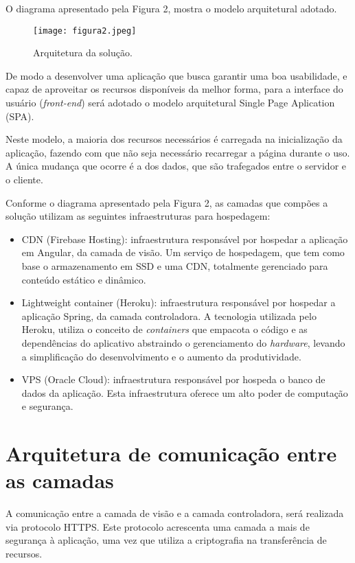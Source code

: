 \documentclass[
    12pt,               %
    openright,          %
    oneside,
    a4paper,            %
    paginasA3,  %
    MODELO,             %
    TODO,               %
    english,            %
    brazil              %
    ]{ifsp-spo-inf-ctds} %
\begin{document}
O diagrama apresentado pela Figura 2, mostra o modelo arquitetural adotado.

\begin{figure}[htb]
    \centering
	\texttt{[image: figura2.jpeg]}
	\caption{\label{fig_logo} Arquitetura da solução.}
\end{figure}
 
De modo a desenvolver uma aplicação que busca garantir uma boa usabilidade, e capaz de aproveitar os recursos disponíveis da melhor forma, para a interface do usuário (\textit{front-end}) será adotado o modelo arquitetural Single Page Aplication (SPA). 

Neste modelo, a maioria dos recursos necessários é carregada na inicialização da aplicação, fazendo com que não seja necessário recarregar a página durante o uso. A única mudança que ocorre é a dos dados, que são trafegados entre o servidor e o cliente.

Conforme o diagrama apresentado pela Figura 2, as camadas que compões a solução utilizam as seguintes infraestruturas para hospedagem:
\begin{itemize}
\item CDN (Firebase Hosting): infraestrutura responsável por hospedar a aplicação em Angular, da camada de visão. Um serviço de hospedagem, que tem como base o armazenamento em SSD e uma CDN, totalmente gerenciado para conteúdo estático e dinâmico.
\item  Lightweight container (Heroku): infraestrutura responsável por hospedar a aplicação Spring, da camada controladora. A tecnologia utilizada pelo Heroku, utiliza o conceito de \textit{containers} que empacota o código e as dependências do aplicativo abstraindo o gerenciamento do \textit{hardware}, levando a simplificação do desenvolvimento e o aumento da produtividade.
\item VPS (Oracle Cloud): infraestrutura responsável por hospeda o banco de dados da aplicação. Esta infraestrutura oferece um alto poder de computação e segurança.
\end{itemize}

\section{Arquitetura de comunicação entre as camadas}
A comunicação entre a camada de visão e a camada controladora, será realizada via protocolo HTTPS. Este protocolo acrescenta uma camada a mais de segurança à aplicação, uma vez que utiliza a criptografia na transferência de recursos.
\end{document}
